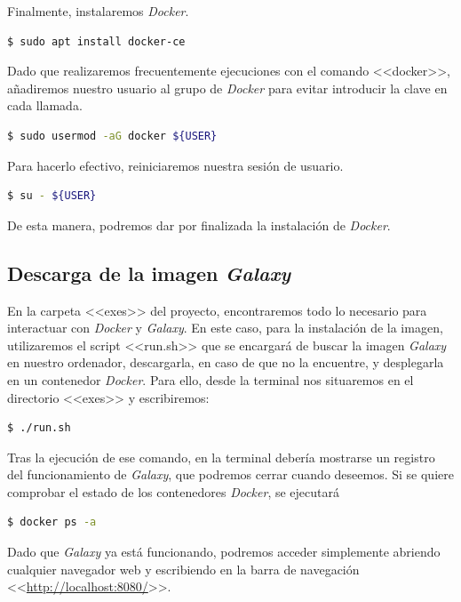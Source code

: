 Finalmente, instalaremos \textit{Docker}.
    \begin{lstlisting}[language=bash]
    $ sudo apt install docker-ce
    \end{lstlisting}
Dado que realizaremos frecuentemente ejecuciones con el comando <<docker>>, añadiremos nuestro usuario al grupo de \textit{Docker} para evitar introducir la clave en cada llamada.
    \begin{lstlisting}[language=bash]
    $ sudo usermod -aG docker ${USER}
    \end{lstlisting}
Para hacerlo efectivo, reiniciaremos nuestra sesión de usuario.
    \begin{lstlisting}[language=bash]
    $ su - ${USER}
    \end{lstlisting}
De esta manera, podremos dar por finalizada la instalación de \textit{Docker}.
\subsection{Descarga de la imagen \textit{Galaxy}}
En la carpeta <<exes>> del proyecto, encontraremos todo lo necesario para interactuar con \textit{Docker} y \textit{Galaxy}. En este caso, para la instalación de la imagen, utilizaremos el script <<run.sh>> que se encargará de buscar la imagen \textit{Galaxy} en nuestro ordenador, descargarla, en caso de que no la encuentre, y desplegarla en un contenedor \textit{Docker}. Para ello, desde la terminal nos situaremos en el directorio <<exes>> y escribiremos:
    \begin{lstlisting}[language=bash]
    $ ./run.sh
    \end{lstlisting}
Tras la ejecución de ese comando, en la terminal debería mostrarse un registro del funcionamiento de \textit{Galaxy}, que podremos cerrar cuando deseemos. Si se quiere comprobar el estado de los contenedores \textit{Docker}, se ejecutará
\begin{lstlisting}[language=bash]
    $ docker ps -a
\end{lstlisting}
Dado que \textit{Galaxy} ya está funcionando, podremos acceder simplemente abriendo cualquier navegador web y escribiendo en la barra de navegación <<\url{http://localhost:8080/}>>.


